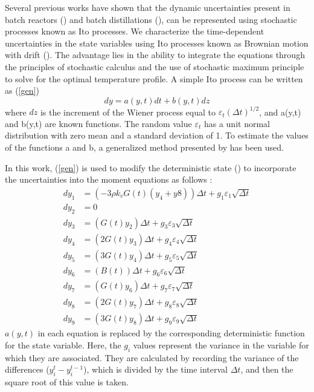 \documentclass[3p,times,authoryear]{elsarticle}
\begin{document}
Several previous works have shown that the dynamic uncertainties present in batch reactors (\cite{benavides}) and batch distillations (\cite{diwekar}), can be represented using stochastic processes known as Ito processes. We characterize the time-dependent uncertainties in the state variables using Ito processes known as Brownian motion with drift (\cite{diwekar,wong}). The advantage lies in the ability to integrate the equations through the principles of stochastic calculus and the use of stochastic maximum principle to solve for the optimal temperature profile. 
A simple Ito process can be written as (\ref{gen})
\begin{equation} \label{gen}
dy = a(y,t)dt + b(y,t)dz
\end{equation}
where $dz$ is the increment of the Wiener process equal to $\varepsilon_{t}(\Delta t)^{1/2}$, and a(y,t) and b(y,t) are known functions. The random value $\varepsilon_{t}$ has a unit normal distribution with zero mean and a standard deviation of 1. To estimate the values of the functions a and b, a generalized method presented by \cite{diwekar} has been used.\par
In this work, (\ref{gen}) is used to modify the deterministic state () to incorporate the uncertainties into the moment equations as follows :
\begin{align}
dy_{1} &= \left(-3\rho k_{v}G(t)(y_{4}+y{8})\right)\Delta t + g_{1}\varepsilon_{1}\sqrt{\Delta t} \label{steq1}\\
dy_{2} &= 0 \\
dy_{3} &= (G(t)y_{2})\Delta t +g_{3}\varepsilon_{3}\sqrt{\Delta t} \\
dy_{4} &= (2G(t)y_{3})\Delta t + g_{4}\varepsilon_{4}\sqrt{\Delta t} \\
dy_{5} &= (3G(t)y_{4})\Delta t + g_{5}\varepsilon_{5}\sqrt{\Delta t} \\
dy_{6} &= (B(t))\Delta t + g_{6}\varepsilon_{6}\sqrt{\Delta t} \\
dy_{7} &= (G(t)y_{6})\Delta t + g_{7}\varepsilon_{7}\sqrt{\Delta t} \\
dy_{8} &= (2G(t)y_{7})\Delta t +g_{8}\varepsilon_{8}\sqrt{\Delta t} \\
dy_{9} &= (3G(t)y_{8})\Delta t + g_{9}\varepsilon_{9}\sqrt{\Delta t} \label{steq2} 
\end{align}
$a(y,t)$ in each equation is replaced by the corresponding deterministic function for the state variable. Here, the $g_{i}$ values represent the variance in the variable for which they are associated. They are calculated by recording the variance of the differences ($y_{i}^{t} - y_{i}^{t-1}$), which is divided by the time interval $\Delta t$, and then the square root of this value is taken. \par
\end{document}
